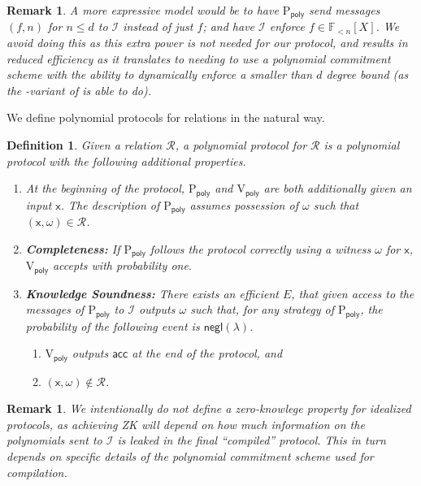 \documentclass[11pt]{article} %
\newcommand{\F}{\ensuremath{\mathbb F}\xspace}
\newcommand{\negl}{\ensuremath{\mathsf{negl}(\lambda)}\xspace}
\newcommand{\acc}{\ensuremath{\mathsf{acc}}\xspace}
\newcommand{\prvpoly}{\ensuremath{\mathrm{P_{\mathsf{poly}}}}\xspace}
\newcommand{\verpoly}{\ensuremath{\mathrm{V_{\mathsf{poly}}}}\xspace}
\newcommand{\ideal}{\ensuremath{\mathcal{I}}\xspace}
\newcommand{\inp}{\ensuremath{\mathsf{x}}\xspace}
\newcommand{\wit}{\ensuremath{\omega}\xspace}
\newcommand{\rel}{\ensuremath{\mathcal{R}}\xspace}
\newcommand{\ext}{\ensuremath{E}\xspace}
\newcommand{\polysofdeg}[1]{\ensuremath{\F_{< #1}[X]}\xspace}
\newtheorem{dfn}[lemma]{Definition}
\newtheorem{remark}[lemma]{Remark}
\begin{document}
\begin{remark}
A more expressive model would be to have \prvpoly send messages $(f,n)$ for $n\leq d$ to \ideal instead of just $f$; and have \ideal enforce $f\in \polysofdeg{n}$. 
We avoid doing this as this extra power is not needed for our protocol, and results in reduced efficiency as it translates to needing to use a polynomial commitment scheme with the ability to dynamically enforce a smaller than $d$ degree bound (as the \cite{sonic}-variant of \cite{kate} is able to do).

\end{remark}




We define polynomial protocols for relations in the natural way.
\begin{dfn}\label{dfn:protforrel}
Given a relation \rel, a \emph{polynomial protocol for \rel} is a polynomial protocol with the following additional properties.
\begin{enumerate}
 \item At the beginning of the protocol, \prvpoly and \verpoly are both additionally given an input \inp. The description of \prvpoly assumes possession of \wit such that $(\inp,\wit)\in \rel$.
 \item \textbf{Completeness:} If \prvpoly follows the protocol correctly using a witness \wit for \inp, \verpoly accepts with probability one.
 \item \textbf{Knowledge Soundness:} There exists an efficient \ext, that given access to the messages of \prvpoly to \ideal outputs \wit such that, for any strategy of \prvpoly, the probability of the following event is \negl.
 \begin{enumerate}
  \item \verpoly outputs \acc at the end of the protocol, and
  \item $(\inp,\wit)\notin \rel$.
 \end{enumerate}

\end{enumerate}
\end{dfn}
\begin{remark}
We intentionally do not define a zero-knowlege property for idealized protocols, as achieving ZK will depend on how much information on the polynomials sent to \ideal is leaked in the final ``compiled'' protocol. This in turn depends on specific details of the polynomial commitment scheme used for compilation.
\end{remark}
\end{document}
